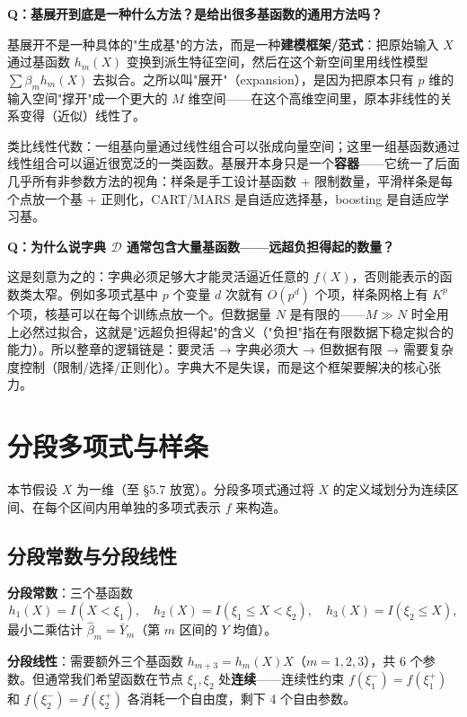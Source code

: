 \begin{qa}
\textbf{Q：基展开到底是一种什么方法？是给出很多基函数的通用方法吗？}

基展开不是一种具体的"生成基"的方法，而是一种\textbf{建模框架/范式}：把原始输入 $X$ 通过基函数 $h_m(X)$ 变换到派生特征空间，然后在这个新空间里用线性模型 $\sum \beta_m h_m(X)$ 去拟合。之所以叫"展开"（expansion），是因为把原本只有 $p$ 维的输入空间"撑开"成一个更大的 $M$ 维空间——在这个高维空间里，原本非线性的关系变得（近似）线性了。

类比线性代数：一组基向量通过线性组合可以张成向量空间；这里一组基函数通过线性组合可以逼近很宽泛的一类函数。基展开本身只是一个\textbf{容器}——它统一了后面几乎所有非参数方法的视角：样条是手工设计基函数 + 限制数量，平滑样条是每个点放一个基 + 正则化，CART/MARS 是自适应选择基，boosting 是自适应学习基。

\textbf{Q：为什么说字典 $\mathcal{D}$ 通常包含大量基函数——远超负担得起的数量？}

这是刻意为之的：字典必须足够大才能灵活逼近任意的 $f(X)$，否则能表示的函数类太窄。例如多项式基中 $p$ 个变量 $d$ 次就有 $O(p^d)$ 个项，样条网格上有 $K^p$ 个项，核基可以在每个训练点放一个。但数据量 $N$ 是有限的——$M \gg N$ 时全用上必然过拟合，这就是"远超负担得起"的含义（"负担"指在有限数据下稳定拟合的能力）。所以整章的逻辑链是：要灵活 → 字典必须大 → 但数据有限 → 需要复杂度控制（限制/选择/正则化）。字典大不是失误，而是这个框架要解决的核心张力。
\end{qa}


\section{分段多项式与样条}

本节假设 $X$ 为一维（至 §5.7 放宽）。分段多项式通过将 $X$ 的定义域划分为连续区间、在每个区间内用单独的多项式表示 $f$ 来构造。

\subsection{分段常数与分段线性}

\textbf{分段常数}：三个基函数
\[
h_1(X) = I(X < \xi_1), \quad h_2(X) = I(\xi_1 \le X < \xi_2), \quad h_3(X) = I(\xi_2 \le X),
\]
最小二乘估计 $\hat{\beta}_m = \bar{Y}_m$（第 $m$ 区间的 $Y$ 均值）。

\textbf{分段线性}：需要额外三个基函数 $h_{m+3} = h_m(X)X$（$m=1,2,3$），共 6 个参数。但通常我们希望函数在节点 $\xi_1, \xi_2$ 处\textbf{连续}——连续性约束 $f(\xi_1^-) = f(\xi_1^+)$ 和 $f(\xi_2^-) = f(\xi_2^+)$ 各消耗一个自由度，剩下 4 个自由参数。

